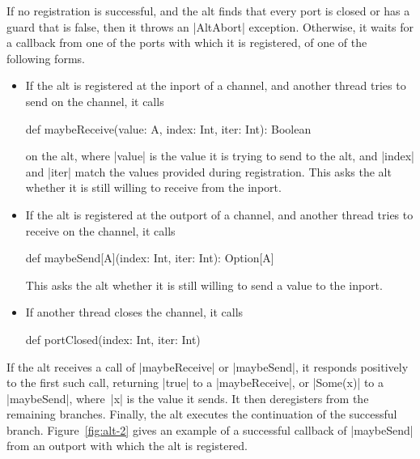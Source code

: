 If no registration is successful, and the alt finds that every port is closed
or has a guard that is false, then it throws an |AltAbort| exception.
Otherwise, it waits for a callback from one of the ports with which it is
registered, of one of the following forms.
%
\begin{itemize}
\item If the alt is registered at the inport of a channel, and another thread
  tries to send on the channel, it calls
\begin{scala}
def maybeReceive(value: A, index: Int, iter: Int): Boolean
\end{scala}
%
on the alt, where |value| is the value it is trying to send to the alt, and
|index| and |iter| match the values provided during registration.  This asks
the alt whether it is still willing to receive from the inport.

\item If the alt is registered at the outport of a channel, and another thread
  tries to receive on the channel, it calls
%
\begin{scala}
def maybeSend[A](index: Int, iter: Int): Option[A]
\end{scala}
%
This asks the alt whether it is still willing to send a value to the inport.

\item If another thread closes the channel, it calls 
%
\begin{scala}
def portClosed(index: Int, iter: Int)
\end{scala}
\end{itemize}

If the alt receives a call of |maybeReceive| or |maybeSend|, it responds
positively to the first such call, returning |true| to a |maybeReceive|, or
|Some(x)| to a |maybeSend|, where~|x| is the value it sends.  It then
deregisters from the remaining branches.  
%
Finally, the alt
executes the continuation of the successful branch.
%
Figure~\ref{fig:alt-2} gives an example of a successful callback of
|maybeSend| from an outport with which the alt is registered.

